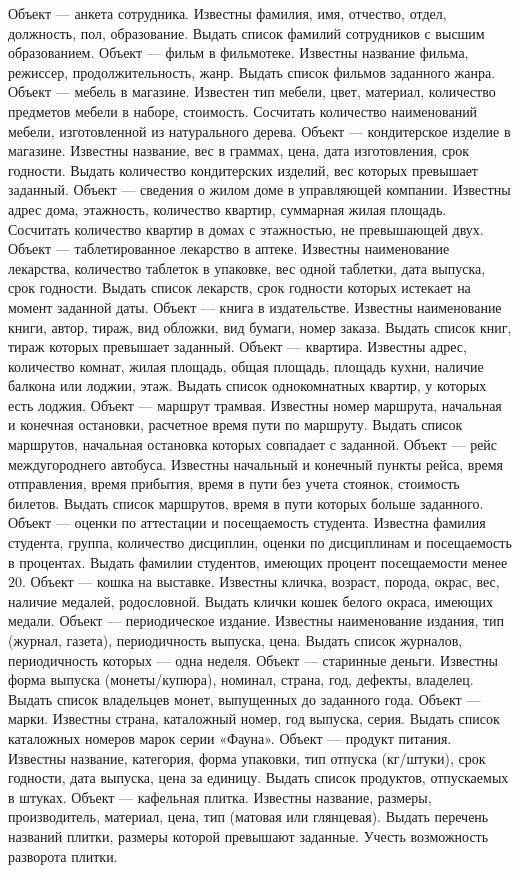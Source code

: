 Объект --- анкета сотрудника. Известны фамилия, имя, отчество, отдел, должность, пол, образование. Выдать список фамилий сотрудников с высшим образованием.
Объект --- фильм в фильмотеке. Известны название фильма, режиссер, продолжительность, жанр. Выдать список фильмов заданного жанра.
Объект --- мебель в магазине. Известен тип мебели, цвет, материал, количество предметов мебели в наборе, стоимость. Сосчитать количество наименований мебели, изготовленной из натурального дерева.
Объект --- кондитерское изделие в магазине. Известны название, вес в граммах, цена, дата изготовления, срок годности. Выдать количество кондитерских изделий, вес которых превышает заданный.
Объект --- сведения о жилом доме в управляющей компании. Известны адрес дома, этажность, количество квартир, суммарная жилая площадь. Сосчитать количество квартир в домах с этажностью, не превышающей двух.
Объект --- таблетированное лекарство в аптеке. Известны наименование лекарства, количество таблеток в упаковке, вес одной таблетки, дата выпуска, срок годности. Выдать список лекарств, срок годности которых истекает на момент заданной даты.
Объект --- книга в издательстве. Известны наименование книги, автор, тираж, вид обложки, вид бумаги, номер заказа. Выдать список книг, тираж которых превышает заданный.
Объект --- квартира. Известны адрес, количество комнат, жилая площадь, общая площадь, площадь кухни, наличие балкона или лоджии, этаж. Выдать список однокомнатных квартир, у которых есть лоджия.
Объект --- маршрут трамвая. Известны номер маршрута, начальная и конечная остановки, расчетное время пути по маршруту. Выдать список маршрутов, начальная остановка которых совпадает с заданной.
Объект --- рейс междугороднего автобуса. Известны начальный и конечный пункты рейса, время отправления, время прибытия, время в пути без учета стоянок, стоимость билетов. Выдать список маршрутов, время в пути которых больше заданного.
Объект --- оценки по аттестации и посещаемость студента. Известна фамилия студента, группа, количество дисциплин, оценки по дисциплинам и посещаемость в процентах. Выдать фамилии студентов, имеющих процент посещаемости менее $20$.
Объект --- кошка на выставке. Известны кличка, возраст, порода, окрас, вес, наличие медалей, родословной. Выдать клички кошек белого окраса, имеющих медали.
Объект --- периодическое издание. Известны наименование издания, тип (журнал, газета), периодичность выпуска, цена. Выдать список журналов, периодичность которых --- одна неделя.
Объект --- старинные деньги. Известны форма выпуска (монеты/купюра), номинал, страна, год, дефекты, владелец. Выдать список владельцев монет, выпущенных до заданного года.
Объект --- марки. Известны страна, каталожный номер, год выпуска, серия. Выдать список каталожных номеров марок серии «Фауна».
Объект --- продукт питания. Известны название, категория, форма упаковки, тип отпуска (кг/штуки), срок годности, дата выпуска, цена за единицу. Выдать список продуктов, отпускаемых в штуках.
Объект --- кафельная плитка. Известны название, размеры, производитель, материал, цена, тип (матовая или глянцевая). Выдать перечень названий плитки, размеры которой превышают заданные. Учесть возможность разворота плитки.
